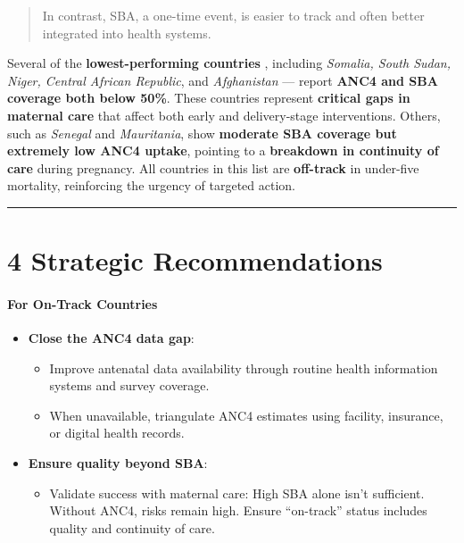 \documentclass[
]{article}
\providecommand{\tightlist}{%
  \setlength{\itemsep}{0pt}\setlength{\parskip}{0pt}}
\begin{document}
\begin{quote}
In contrast, SBA, a one-time event, is easier to track and often better
integrated into health systems.
\end{quote}

Several of the \textbf{lowest-performing countries} , including
\emph{Somalia, South Sudan, Niger, Central African Republic}, and
\emph{Afghanistan} --- report \textbf{ANC4 and SBA coverage both below
50\%}. These countries represent \textbf{critical gaps in maternal care}
that affect both early and delivery-stage interventions. Others, such as
\emph{Senegal} and \emph{Mauritania}, show \textbf{moderate SBA coverage
but extremely low ANC4 uptake}, pointing to a \textbf{breakdown in
continuity of care} during pregnancy. All countries in this list are
\textbf{off-track} in under-five mortality, reinforcing the urgency of
targeted action.

\begin{center}\rule{0.5\linewidth}{0.5pt}\end{center}

\section{4 Strategic Recommendations}\label{strategic-recommendations}

\paragraph{\texorpdfstring{\textbf{For On-Track
Countries}}{For On-Track Countries}}\label{for-on-track-countries}

\begin{itemize}
\tightlist
\item
  \textbf{Close the ANC4 data gap}:

  \begin{itemize}
  \tightlist
  \item
    Improve antenatal data availability through routine health
    information systems and survey coverage.
  \item
    When unavailable, triangulate ANC4 estimates using facility,
    insurance, or digital health records.
  \end{itemize}
\item
  \textbf{Ensure quality beyond SBA}:

  \begin{itemize}
  \tightlist
  \item
    Validate success with maternal care: High SBA alone isn't
    sufficient. Without ANC4, risks remain high. Ensure ``on-track''
    status includes quality and continuity of care.
  \end{itemize}
\end{itemize}
\end{document}

